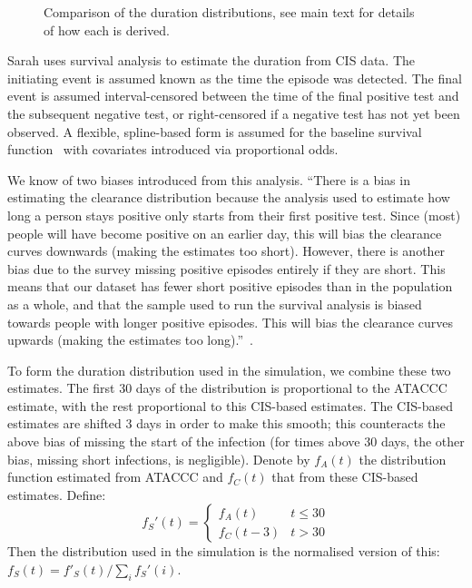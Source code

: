 \documentclass[main.tex]{subfiles}
\begin{document}
\begin{figure}
  \caption{Comparison of the duration distributions, see main text for details of how each is derived. \label{perf-test:fig:duration-dist}}
\end{figure}

Sarah uses survival analysis to estimate the duration from CIS data.
The initiating event is assumed known as the time the episode was detected.
The final event is assumed interval-censored between the time of the final positive test and the subsequent negative test, or right-censored if a negative test has not yet been observed.
A flexible, spline-based form is assumed for the baseline survival function~\autocite{roystonSTPM,roystonFlexible} with covariates introduced via proportional odds.

We know of two biases introduced from this analysis.
\enquote{There is a bias in estimating the clearance distribution because the analysis used to estimate how long a person stays positive only starts from their first positive test.
Since (most) people will have become positive on an earlier day, this will bias the clearance curves downwards (making the estimates too short).
However, there is another bias due to the survey missing positive episodes entirely if they are short.
This means that our dataset has fewer short positive episodes than in the population as a whole, and that the sample used to run the survival analysis is biased towards people with longer positive episodes.
This will bias the clearance curves upwards (making the estimates too long).}~\autocite{cisMethodsONS}.

To form the duration distribution used in the simulation, we combine these two estimates.
The first 30 days of the distribution is proportional to the ATACCC estimate, with the rest proportional to this CIS-based estimates.
The CIS-based estimates are shifted 3 days in order to make this smooth; this counteracts the above bias of missing the start of the infection (for times above 30 days, the other bias, missing short infections, is negligible).
Denote by $f_A(t)$ the distribution function estimated from ATACCC and $f_C(t)$ that from these CIS-based estimates.
Define:
$$
f_S'(t) = \begin{cases}
	f_A(t) &t \leq 30 \\
	f_C(t-3) &t > 30
\end{cases}
$$
Then the distribution used in the simulation is the normalised version of this: $f_S(t) = f'_S(t)/\sum_i f_S'(i)$.
\end{document}
